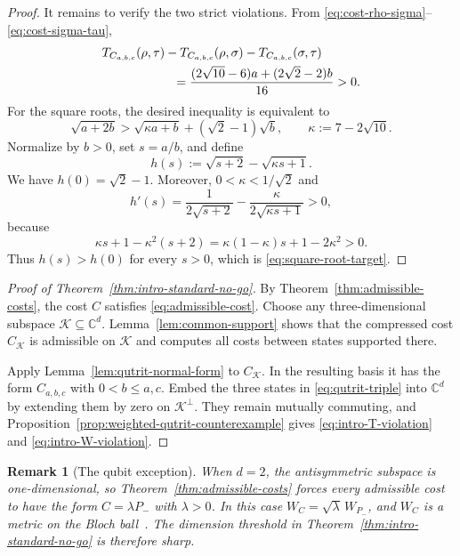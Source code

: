 \documentclass[11pt]{article}
\newtheorem{remark}{Remark}[section]
\newcommand{\calK}{\mathcal{K}}
\begin{document}
\begin{proof}
    It remains to verify the two strict violations.  From
    \eqref{eq:cost-rho-sigma}--\eqref{eq:cost-sigma-tau},
    \begin{align}
        &T_{C_{a,b,c}}(\rho,\tau)
        -T_{C_{a,b,c}}(\rho,\sigma)
        -T_{C_{a,b,c}}(\sigma,\tau)\notag\\
        &\hspace{2cm}
        =\frac{(2\sqrt{10}-6)a+(2\sqrt2-2)b}{16}>0.
        \label{eq:transport-cost-positive-gap}
    \end{align}
    For the square roots, the desired inequality is equivalent to
    \begin{equation}\label{eq:square-root-target}
        \sqrt{a+2b}
        >\sqrt{\kappa a+b}+(\sqrt2-1)\sqrt b,
        \qquad
        \kappa:=7-2\sqrt{10}.
    \end{equation}
    Normalize by $b>0$, set $s=a/b$, and define
    \[
        h(s):=\sqrt{s+2}-\sqrt{\kappa s+1}.
    \]
    We have $h(0)=\sqrt2-1$.  Moreover,
    $0<\kappa<1/\sqrt2$ and
    \[
        h'(s)=\frac1{2\sqrt{s+2}}
              -\frac{\kappa}{2\sqrt{\kappa s+1}}>0,
    \]
    because
    \[
        \kappa s+1-\kappa^2(s+2)
        =\kappa(1-\kappa)s+1-2\kappa^2>0.
    \]
    Thus $h(s)>h(0)$ for every $s>0$, which is
    \eqref{eq:square-root-target}.
\end{proof}

\begin{proof}[Proof of Theorem~\ref{thm:intro-standard-no-go}]
    By Theorem~\ref{thm:admissible-costs}, the cost $C$ satisfies
    \eqref{eq:admissible-cost}.  Choose any three-dimensional subspace
    $\calK\subseteq\mathbb{C}^d$.  Lemma~\ref{lem:common-support} shows that
    the compressed cost $C_{\calK}$ is admissible on $\calK$ and computes
    all costs between states supported there.

    Apply Lemma~\ref{lem:qutrit-normal-form} to $C_{\calK}$.  In the
    resulting basis it has the form $C_{a,b,c}$ with $0<b\leq a,c$.  Embed
    the three states in \eqref{eq:qutrit-triple} into $\mathbb{C}^d$ by
    extending them by zero on $\calK^\perp$.  They remain mutually
    commuting, and Proposition~\ref{prop:weighted-qutrit-counterexample}
    gives \eqref{eq:intro-T-violation} and
    \eqref{eq:intro-W-violation}.
\end{proof}

\begin{remark}[The qubit exception]\label{rem:qubit-exception}
    When $d=2$, the antisymmetric subspace is one-dimensional, so
    Theorem~\ref{thm:admissible-costs} forces every admissible cost to have
    the form $C=\lambda P_-$ with $\lambda>0$.  In this case
    $W_C=\sqrt\lambda\,W_{P_-}$, and $W_C$ is a metric on the Bloch
    ball~\cite{FECZ22,CEFZ23}.  The dimension threshold in
    Theorem~\ref{thm:intro-standard-no-go} is therefore sharp.
\end{remark}
\end{document}
